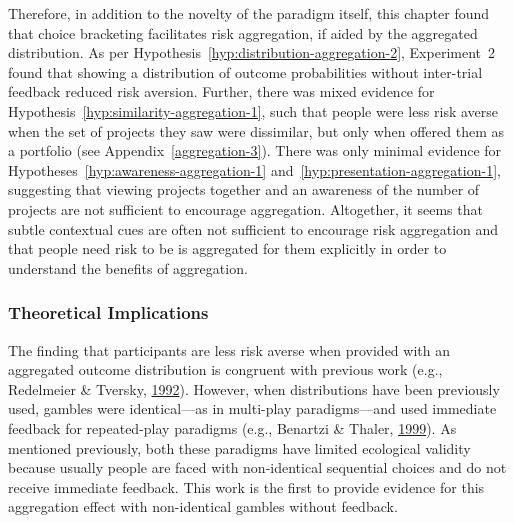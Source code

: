 \documentclass[
  english,
  man, donotrepeattitle,floatsintext]{apa7}
\theoremstyle{definition}
\theoremstyle{definition}
\theoremstyle{definition}
\theoremstyle{definition}
\theoremstyle{remark}
\begin{document}
Therefore, in addition to the novelty of the paradigm itself, this chapter found
that choice bracketing facilitates risk aggregation, if aided by the aggregated
distribution. As per Hypothesis~\ref{hyp:distribution-aggregation-2},
Experiment~2 found that showing a distribution of outcome probabilities without
inter-trial feedback reduced risk aversion. Further, there was mixed evidence
for Hypothesis~\ref{hyp:similarity-aggregation-1}, such that people were less
risk averse when the set of projects they saw were dissimilar, but only when
offered them as a portfolio (see Appendix~\ref{aggregation-3}). There was only
minimal evidence for Hypotheses~\ref{hyp:awareness-aggregation-1}
and~\ref{hyp:presentation-aggregation-1}, suggesting that viewing projects
together and an awareness of the number of projects are not sufficient to
encourage aggregation. Altogether, it seems that subtle contextual cues are
often not sufficient to encourage risk aggregation and that people need risk to
be is aggregated for them explicitly in order to understand the benefits of
aggregation.

\hypertarget{theoretical-implications}{%
\subsubsection{Theoretical Implications}\label{theoretical-implications}}

The finding that participants are less risk averse when provided with an
aggregated outcome distribution is congruent with previous work (e.g., Redelmeier \& Tversky, \protect\hyperlink{ref-redelmeier1992}{1992}). However, when distributions have been previously used, gambles
were identical---as in multi-play paradigms---and used immediate feedback for
repeated-play paradigms (e.g., Benartzi \& Thaler, \protect\hyperlink{ref-benartzi1999}{1999}). As mentioned previously, both
these paradigms have limited ecological validity because usually people are
faced with non-identical sequential choices and do not receive immediate
feedback. This work is the first to provide evidence for this aggregation effect
with non-identical gambles without feedback.
\end{document}
